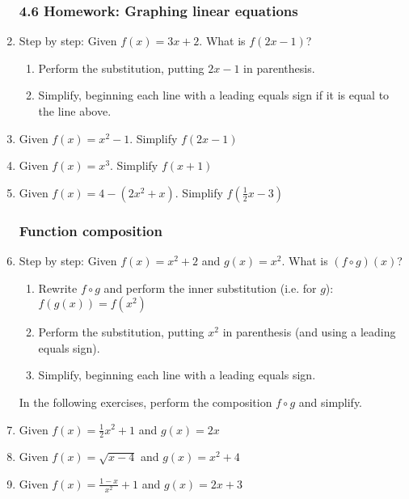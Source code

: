 \documentclass[12pt, twoside]{article}
\begin{document}
\begin{enumerate}
    \subsubsection*{4.6 Homework: Graphing linear equations}
      \item Step by step: Given $f(x)=3x+2$. What is $f(2x-1)$?
        \begin{enumerate}
            \item Perform the substitution, putting $2x-1$ in parenthesis.
            \item Simplify, beginning each line with a leading equals sign if it is equal to the line above.
        \end{enumerate}
      \item Given $f(x)=x^2-1$. Simplify $f(2x-1)$
      \item Given $f(x)=x^3$. Simplify $f(x+1)$
      \item Given $f(x)=4-(2x^2+x)$. Simplify $f(\frac{1}{2}x-3)$
    
      \subsubsection*{Function composition}
      \item Step by step: Given $f(x)=x^2+2$ and $g(x)=x^2$. What is $(f \circ g)(x)$?
      \begin{enumerate}
          \item Rewrite $f \circ g$ and perform the inner substitution (i.e. for $g$): $f(g(x))=f(x^2)$
          \item Perform the substitution, putting $x^2$ in parenthesis (and using a leading equals sign).
          \item Simplify, beginning each line with a leading equals sign.
      \end{enumerate}
      In the following exercises, perform the composition $f \circ g$ and simplify.
      \item Given $f(x)=\frac{1}{2}x^2+1$ and $g(x)=2x$
      \item Given $f(x)=\sqrt{x-4}$ and $g(x)=x^2+4$
      \item Given $\displaystyle f(x)=\frac{1-x}{x^2}+1$ and $g(x)=2x+3$
    

\end{enumerate}
\end{document}
